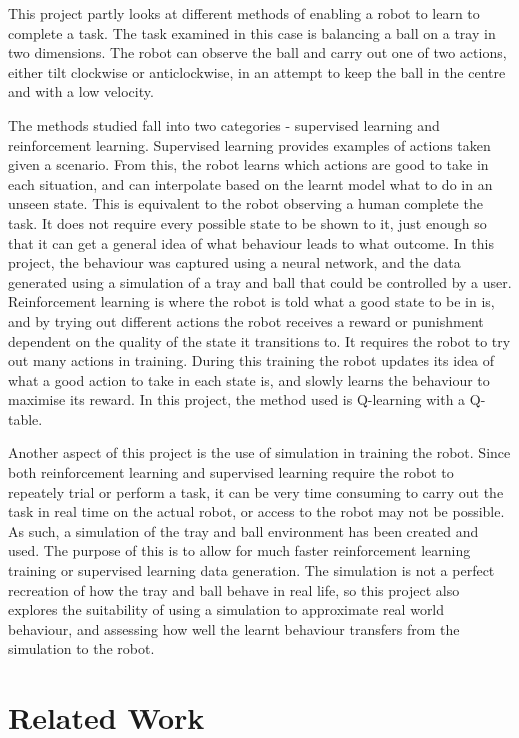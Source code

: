 \documentclass[12pt,a4paper]{article}
\begin{document}
This project partly looks at different methods of enabling a robot to learn to complete a task. The task examined in this case is balancing a ball on a tray in two dimensions. The robot can observe the ball and carry out one of two actions, either tilt clockwise or anticlockwise, in an attempt to keep the ball in the centre and with a low velocity. 

The methods studied fall into two categories - supervised learning and reinforcement learning. Supervised learning provides examples of actions taken given a scenario. From this, the robot learns which actions are good to take in each situation, and can interpolate based on the learnt model what to do in an unseen state. This is equivalent to the robot observing a human complete the task. It does not require every possible state to be shown to it, just enough so that it can get a general idea of what behaviour leads to what outcome. In this project, the behaviour was captured using a neural network, and the data generated using a simulation of a tray and ball that could be controlled by a user. Reinforcement learning is where the robot is told what a good state to be in is, and by trying out different actions the robot receives a reward or punishment dependent on the quality of the state it transitions to. It requires the robot to try out many actions in training. During this training the robot updates its idea of what a good action to take in each state is, and slowly learns the behaviour to maximise its reward. In this project, the method used is Q-learning with a Q-table. 

Another aspect of this project is the use of simulation in training the robot. Since both reinforcement learning and supervised learning require the robot to repeately trial or perform a task, it can be very time consuming to carry out the task in real time on the actual robot, or access to the robot may not be possible. As such, a simulation of the tray and ball environment has been created and used. The purpose of this is to allow for much faster reinforcement learning training or supervised learning data generation. The simulation is not a perfect recreation of how the tray and ball behave in real life, so this project also explores the suitability of using a simulation to approximate real world behaviour, and assessing how well the learnt behaviour transfers from the simulation to the robot. 

\section{Related Work}
\end{document}
